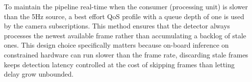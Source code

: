 To maintain the pipeline real-time when the consumer (processing unit) is slower than the 5Hz source, a best effort QoS profile with a queue depth of one is used by the camera subscriptions. This method ensures that the detector always processes the newest available frame rather than accumulating a backlog of stale ones. This design choice specifically matters because on-board inference on constrained hardware can run slower than the frame rate, discarding stale frames keeps detection latency controlled at the cost of skipping frames than letting delay grow unbounded.
